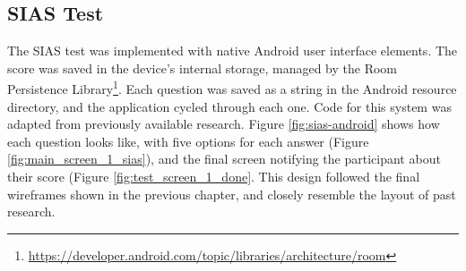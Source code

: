\documentclass{l4proj}
\begin{document}
\subsection{SIAS Test}
The SIAS test was implemented with native Android user interface elements. The score was saved in the device's internal storage, managed by the Room Persistence Library\footnote{\url{https://developer.android.com/topic/libraries/architecture/room}}. Each question was saved as a string in the Android resource directory, and the application cycled through each one. Code for this system was adapted from previously available research. Figure \ref{fig:sias-android} shows how each question looks like, with five options for each answer (Figure \ref{fig:main_screen_1_sias}), and the final screen notifying the participant about their score (Figure \ref{fig:test_screen_1_done}. This design followed the final wireframes shown in the previous chapter, and closely resemble the layout of past research. 
\end{document}
